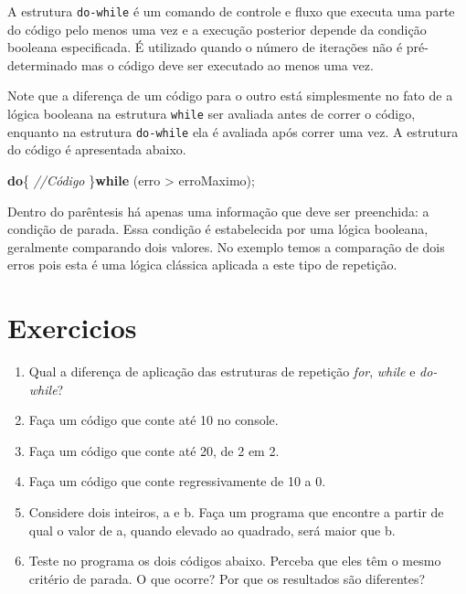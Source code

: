 \documentclass[
]{book}
\newenvironment{Shaded}{\begin{snugshade}}{\end{snugshade}}
\newcommand{\CommentTok}[1]{\textcolor[rgb]{0.56,0.35,0.01}{\textit{#1}}}
\newcommand{\KeywordTok}[1]{\textcolor[rgb]{0.13,0.29,0.53}{\textbf{#1}}}
\newcommand{\NormalTok}[1]{#1}
\providecommand{\tightlist}{%
  \setlength{\itemsep}{0pt}\setlength{\parskip}{0pt}}
\begin{document}
A estrutura \texttt{do-while} é um comando de controle e fluxo que executa uma parte do código pelo menos uma vez e a execução posterior depende da condição booleana especificada. É utilizado quando o número de iterações não é pré-determinado mas o código deve ser executado ao menos uma vez.

Note que a diferença de um código para o outro está simplesmente no fato de a lógica booleana na estrutura \texttt{while} ser avaliada antes de correr o código, enquanto na estrutura \texttt{do-while} ela é avaliada após correr uma vez. A estrutura do código é apresentada abaixo.

\begin{Shaded}
\begin{Highlighting}[]
\KeywordTok{do}\NormalTok{\{}
    \CommentTok{//Código}
\NormalTok{\}}\KeywordTok{while}\NormalTok{ (erro > erroMaximo);}
\end{Highlighting}
\end{Shaded}

Dentro do parêntesis há apenas uma informação que deve ser preenchida: a condição de parada. Essa condição é estabelecida por uma lógica booleana, geralmente comparando dois valores. No exemplo temos a comparação de dois erros pois esta é uma lógica clássica aplicada a este tipo de repetição.

\hypertarget{exercicios}{%
\section*{Exercicios}\label{exercicios}}

\begin{enumerate}
\def\labelenumi{\arabic{enumi}.}
\tightlist
\item
  Qual a diferença de aplicação das estruturas de repetição \emph{for}, \emph{while} e \emph{do-while}?
\item
  Faça um código que conte até 10 no console.
\item
  Faça um código que conte até 20, de 2 em 2.
\item
  Faça um código que conte regressivamente de 10 a 0.
\item
  Considere dois inteiros, a e b. Faça um programa que encontre a partir de qual o valor de a, quando elevado ao quadrado, será maior que b.
\item
  Teste no programa os dois códigos abaixo. Perceba que eles têm o mesmo critério de parada. O que ocorre? Por que os resultados são diferentes?
\end{enumerate}
\end{document}
